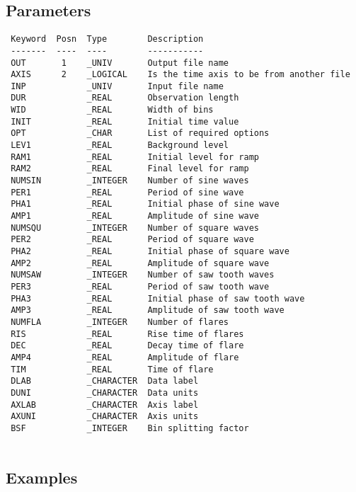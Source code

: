 \documentclass{book}
\renewcommand{\_}{{\tt\char'137}}     %
\begin{document}
\subsection{Parameters}
\begin{verbatim}
 Keyword  Posn  Type        Description
 -------  ----  ----        -----------
 OUT       1    _UNIV       Output file name
 AXIS      2    _LOGICAL    Is the time axis to be from another file
 INP            _UNIV       Input file name
 DUR            _REAL       Observation length
 WID            _REAL       Width of bins
 INIT           _REAL       Initial time value
 OPT            _CHAR       List of required options
 LEV1           _REAL       Background level
 RAM1           _REAL       Initial level for ramp
 RAM2           _REAL       Final level for ramp
 NUMSIN         _INTEGER    Number of sine waves
 PER1           _REAL       Period of sine wave
 PHA1           _REAL       Initial phase of sine wave
 AMP1           _REAL       Amplitude of sine wave
 NUMSQU         _INTEGER    Number of square waves
 PER2           _REAL       Period of square wave
 PHA2           _REAL       Initial phase of square wave
 AMP2           _REAL       Amplitude of square wave
 NUMSAW         _INTEGER    Number of saw tooth waves
 PER3           _REAL       Period of saw tooth wave
 PHA3           _REAL       Initial phase of saw tooth wave
 AMP3           _REAL       Amplitude of saw tooth wave
 NUMFLA         _INTEGER    Number of flares
 RIS            _REAL       Rise time of flares
 DEC            _REAL       Decay time of flare
 AMP4           _REAL       Amplitude of flare
 TIM            _REAL       Time of flare
 DLAB           _CHARACTER  Data label
 DUNI           _CHARACTER  Data units
 AXLAB          _CHARACTER  Axis label
 AXUNI          _CHARACTER  Axis units
 BSF            _INTEGER    Bin splitting factor
 
\end{verbatim}\subsection{Examples}
\end{document}
